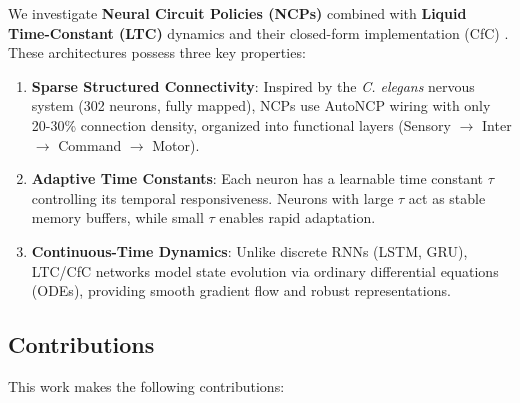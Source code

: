 \documentclass[11pt,twocolumn]{article}
\begin{document}
We investigate \textbf{Neural Circuit Policies (NCPs)} \cite{lechner2020neural} combined with \textbf{Liquid Time-Constant (LTC)} dynamics \cite{hasani2021liquid} and their closed-form implementation (CfC) \cite{hasani2022closed}. These architectures possess three key properties:

\begin{enumerate}
    \item \textbf{Sparse Structured Connectivity}: Inspired by the \textit{C. elegans} nervous system (302 neurons, fully mapped), NCPs use AutoNCP wiring with only 20-30\% connection density, organized into functional layers (Sensory $\rightarrow$ Inter $\rightarrow$ Command $\rightarrow$ Motor).
    
    \item \textbf{Adaptive Time Constants}: Each neuron has a learnable time constant $\tau$ controlling its temporal responsiveness. Neurons with large $\tau$ act as stable memory buffers, while small $\tau$ enables rapid adaptation.
    
    \item \textbf{Continuous-Time Dynamics}: Unlike discrete RNNs (LSTM, GRU), LTC/CfC networks model state evolution via ordinary differential equations (ODEs), providing smooth gradient flow and robust representations.
\end{enumerate}

\subsection{Contributions}

This work makes the following contributions:
\end{document}
